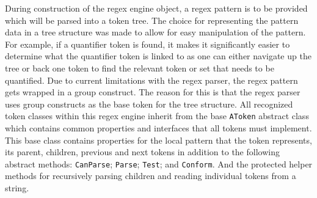 During construction of the regex engine object, a regex pattern is to be provided which will be parsed into a token tree. The choice for representing the pattern data in a tree structure was made to allow for easy manipulation of the pattern. For example, if a quantifier token is found, it makes it significantly easier to determine what the quantifier token is linked to as one can either navigate up the tree or back one token to find the relevant token or set that needs to be quantified.
Due to current limitations with the regex parser, the regex pattern gets wrapped in a group construct. The reason for this is that the regex parser uses group constructs as the base token for the tree structure. All recognized token classes within this regex engine inherit from the base \texttt{AToken} abstract class which contains common properties and interfaces that all tokens must implement. This base class contains properties for the local pattern that the token represents, its parent, children, previous and next tokens in addition to the following abstract methods: \texttt{CanParse}; \texttt{Parse}; \texttt{Test}; and \texttt{Conform}. And the protected helper methods for recursively parsing children and reading individual tokens from a string.


